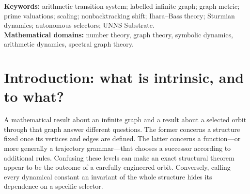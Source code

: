 \documentclass[11pt,a4paper]{article}
\theoremstyle{definition}\newtheorem{definition}[theorem]{Definition}
\begin{document}
\setcounter{page}{1}
\begin{abstract}
The arithmetic transformation $T_N(x)=x(N+1)^2/N$, defined on positive integers with $N\mid x$, gives rise to several mathematically distinct objects that share a common transition law but differ in the extra structure they retain or impose. We distinguish: (I) the complete labelled arithmetic transition system; (II) the undirected all-branch arithmetic graph and its integer-labelled metric geometry; (III) nonbacktracking history dynamics derived from the graph without a priority selector; and (IV) autonomous selected dynamics obtained by imposing a state-dependent choice of one legal branch. This separation provides a rigorous interpretation of the established results of the Geometry, Prime-Valuation, Autonomous Aperiodicity, and Graph Entropy manuscripts. We give a detailed proof that the sharp doubling-distance constant is $5$, deduce the selector independence of the unselected graph, and explain the distinction between abstract graph invariants and invariants of an arithmetic-labelled graph. We derive the arithmetic--topology--entropy identity for a family of arithmetic book graphs and contrast unbounded finite-subgraph history entropy with zero-entropy Sturmian behaviour under MAXPP. We add a third distinction, between structure, its lower-dimensional representation and a selected trajectory, and prove a sharp criterion for when a finite prime-valuation projection retains branch legality, supported by exact visual counterexamples. Finally, we discuss what is and is not meant by intrinsic structure, identify which mathematical decisions enter at each layer, compare the hierarchy with standard graph and dynamical constructions, and formulate testable research directions. No new physical constant, universal graph invariance across different generating rules, or equivalence of separate UNNS grammars is asserted.
\end{abstract}
\vspace{3mm}
\noindent\textbf{Keywords:} arithmetic transition system; labelled infinite graph; graph metric; prime valuations; scaling; nonbacktracking shift; Ihara--Bass theory; Sturmian dynamics; autonomous selectors; UNNS Substrate.\\
\textbf{Mathematical domains:} number theory, graph theory, symbolic dynamics, arithmetic dynamics, spectral graph theory.
\setcounter{tocdepth}{1}\tableofcontents
\newpage
\section{Introduction: what is intrinsic, and to what?}
\label{sec:intro}
A mathematical result about an infinite graph and a result about a selected orbit through that graph answer different questions. The former concerns a structure fixed once its vertices and edges are defined. The latter concerns a function---or more generally a trajectory grammar---that chooses a successor according to additional rules. Confusing these levels can make an exact structural theorem appear to be the outcome of a carefully engineered orbit. Conversely, calling every dynamical constant an invariant of the whole structure hides its dependence on a specific selector.
\end{document}
